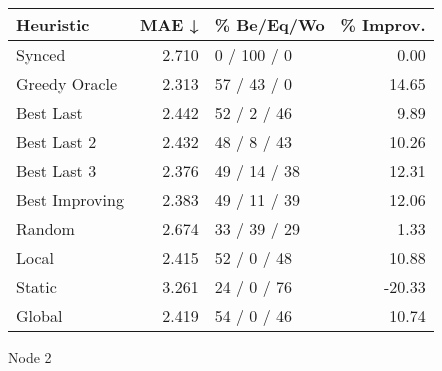 \begin{tabular}{lrlr}
\toprule
\textbf{Heuristic} & \textbf{MAE ↓} & \textbf{\% Be/Eq/Wo} & \textbf{\% Improv.} \\
\midrule
            Synced &          2.710 &          0 / 100 / 0 &                0.00 \\
     Greedy Oracle &          2.313 &          57 / 43 / 0 &               14.65 \\
         Best Last &          2.442 &          52 / 2 / 46 &                9.89 \\
       Best Last 2 &          2.432 &          48 / 8 / 43 &               10.26 \\
       Best Last 3 &          2.376 &         49 / 14 / 38 &               12.31 \\
    Best Improving &          2.383 &         49 / 11 / 39 &               12.06 \\
            Random &          2.674 &         33 / 39 / 29 &                1.33 \\
             Local &          2.415 &          52 / 0 / 48 &               10.88 \\
            Static &          3.261 &          24 / 0 / 76 &              -20.33 \\
            Global &          2.419 &          54 / 0 / 46 &               10.74 \\
\bottomrule
\end{tabular}
\caption{Node 2}
\label{tab:ds_iid_lr05_le2_bs2_2}
